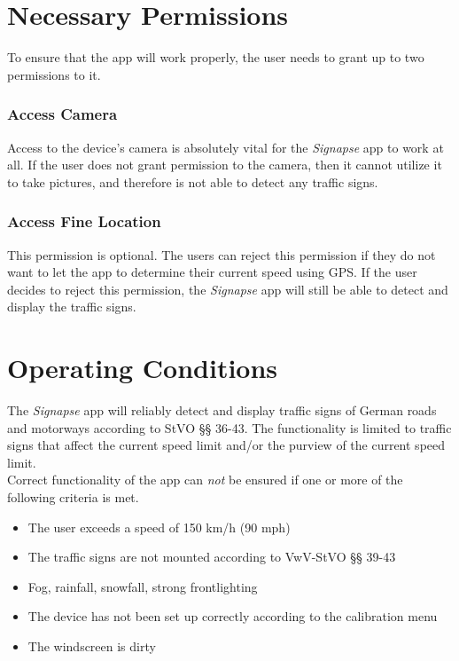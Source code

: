 \documentclass[12pt,a4paper,english,enabledeprecatedfontcommands]{article}
\begin{document}
\section{Necessary Permissions}

To ensure that the app will work properly, the user needs to grant up to two permissions to it.

\subsubsection*{Access Camera} Access to the device's camera is absolutely vital for the \textit{Signapse} app to work at all. If the user does not grant permission to the camera, then it cannot utilize it to take pictures, and therefore is not able to detect any traffic signs.

\subsubsection*{Access Fine Location} This permission is optional. The users can reject this permission if they do not want to let the app to determine their current speed using GPS. If the user decides to reject this permission, the \textit{Signapse} app will still be able to detect and display the traffic signs.

\section{Operating Conditions}

The \textit{Signapse} app will reliably detect and display traffic signs of German roads and motorways according to StVO §§ 36-43. The functionality is limited to traffic signs that affect the current speed limit and/or the purview of the current speed limit.\\

Correct functionality of the app can \emph{not} be ensured if one or more of the following criteria is met.

\begin{itemize}
    \item The user exceeds a speed of 150 km/h (90 mph)
    \item The traffic signs are not mounted according to VwV-StVO §§ 39-43
    \item Fog, rainfall, snowfall, strong frontlighting
    \item The device has not been set up correctly according to the calibration menu
    \item The windscreen is dirty
\end{itemize}
\end{document}
